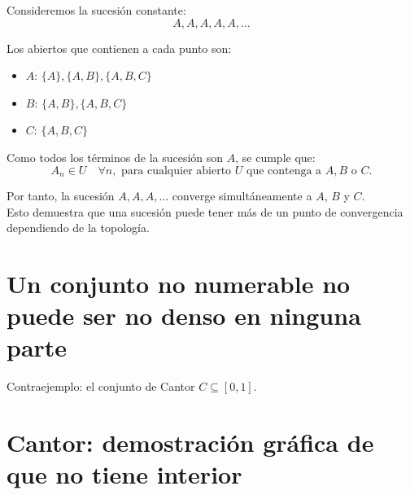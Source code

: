 \documentclass[12pt]{article}
\begin{document}
Consideremos la sucesión constante:
\[
A, A, A, A, A, \dots
\]

Los abiertos que contienen a cada punto son:
\begin{itemize}
    \item \(A\): \(\{A\}, \{A,B\}, \{A,B,C\}\)
    \item \(B\): \(\{A,B\}, \{A,B,C\}\)
    \item \(C\): \(\{A,B,C\}\)
\end{itemize}

Como todos los términos de la sucesión son \(A\), se cumple que:
\[
A_n \in U \quad \forall n, \text{ para cualquier abierto } U \text{ que contenga a } A, B \text{ o } C.
\]

Por tanto, la sucesión \(A, A, A, \dots\) converge simultáneamente a \(A\), \(B\) y \(C\). \\
Esto demuestra que una sucesión puede tener más de un punto de convergencia dependiendo de la topología.
\section*{Un conjunto no numerable no puede ser no denso en ninguna parte}
Contraejemplo: el conjunto de Cantor \(C\subseteq[0,1]\).
\section*{Cantor: demostración gráfica de que no tiene interior}
\end{document}
